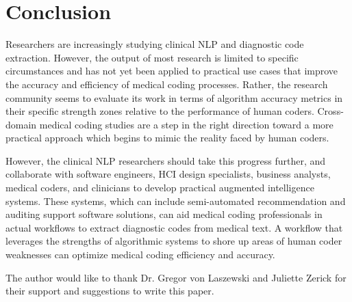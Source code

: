 \documentclass[sigconf]{acmart}
\begin{document}
\section{Conclusion}
Researchers are increasingly studying clinical NLP and diagnostic code extraction. However, the output of most research is limited to specific circumstances and has not yet been applied to practical use cases that improve the accuracy and efficiency of medical coding processes. Rather, the research community seems to evaluate its work in terms of algorithm accuracy metrics in their specific strength zones relative to the performance of human coders. Cross-domain medical coding studies are a step in the right direction toward a more practical approach which begins to mimic the reality faced by human coders.

However, the clinical NLP researchers should take this progress further, and collaborate with software engineers, HCI design specialists, business analysts, medical coders, and clinicians to develop practical augmented intelligence systems. These systems, which can include semi-automated recommendation and auditing support software solutions, can aid medical coding professionals in actual workflows to extract diagnostic codes from medical text. A workflow that leverages the strengths of algorithmic systems to shore up areas of human coder weaknesses can optimize medical coding efficiency and accuracy.

\begin{acks}
The author would like to thank Dr. Gregor von Laszewski and Juliette Zerick for their support and suggestions to write this paper.
\end{acks}


 
\end{document}
